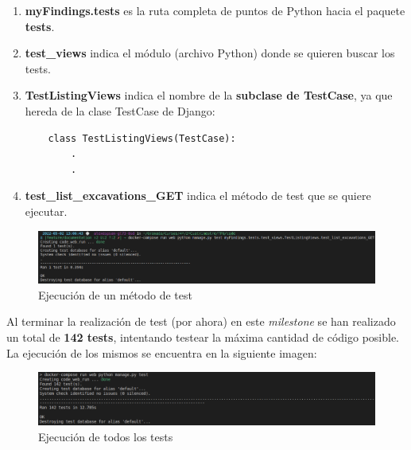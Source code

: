     \begin{enumerate}
        \item \textbf{myFindings.tests} es la ruta completa de puntos de Python hacia el
        paquete \textbf{tests}.
        \item \textbf{test\_views} indica el módulo (archivo Python) donde se quieren
        buscar los tests.
        \item \textbf{TestListingViews} indica el nombre de la \textbf{subclase de TestCase},
        ya que hereda de la clase TestCase de Django:
    
    \begin{verbatim}
    class TestListingViews(TestCase):
        .
        .
    \end{verbatim}
        \newpage \item \textbf{test\_list\_excavations\_GET} indica el método de test que se quiere
        ejecutar.
    \end{enumerate}

    \begin{figure}[H]
        \centering
        \includegraphics[scale=0.27]{imagenes/one-test.png}
        \caption{Ejecución de un método de test}
        \label{fig:one-test}
    \end{figure}

Al terminar la realización de test (por ahora) en este \textit{milestone} se han realizado
un total de \textbf{142 tests}, intentando testear la máxima cantidad de código posible.
La ejecución de los mismos se encuentra en la siguiente imagen:

    \begin{figure}[H]
        \centering
        \includegraphics[scale=0.30]{imagenes/all-tests.png}
        \caption{Ejecución de todos los tests}
        \label{fig:all-tests}
    \end{figure}

